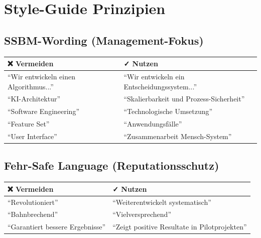\documentclass[11pt,a4paper]{article}
\begin{document}

\tableofcontents
\newpage


\section*{Style-Guide Prinzipien}

\subsection*{SSBM-Wording (Management-Fokus)}

\begin{center}
\begin{tabular}{p{6cm}p{6cm}}
\toprule
\textbf{❌ Vermeiden} & \textbf{✓ Nutzen} \\
\midrule
``Wir entwickeln einen Algorithmus...'' & ``Wir entwickeln ein Entscheidungssystem...'' \\
``KI-Architektur'' & ``Skalierbarkeit und Prozess-Sicherheit'' \\
``Software Engineering'' & ``Technologische Umsetzung'' \\
``Feature Set'' & ``Anwendungsfälle'' \\
``User Interface'' & ``Zusammenarbeit Mensch-System'' \\
\bottomrule
\end{tabular}
\end{center}

\subsection*{Fehr-Safe Language (Reputationsschutz)}

\begin{center}
\begin{tabular}{p{6cm}p{6cm}}
\toprule
\textbf{❌ Vermeiden} & \textbf{✓ Nutzen} \\
\midrule
``Revolutioniert'' & ``Weiterentwickelt systematisch'' \\
``Bahnbrechend'' & ``Vielversprechend'' \\
``Garantiert bessere Ergebnisse'' & ``Zeigt positive Resultate in Pilotprojekten'' \\
\bottomrule
\end{tabular}
\end{center}
\end{document}
